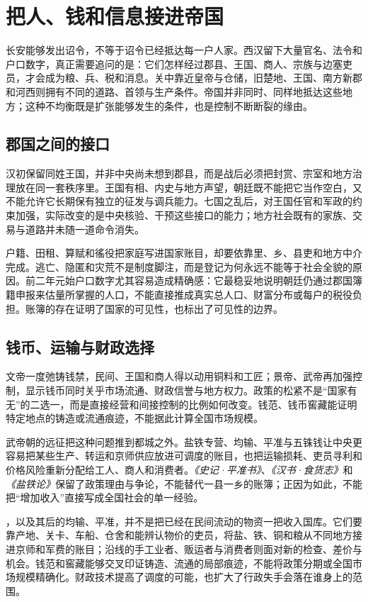 \section{把人、钱和信息接进帝国}
\label{sec:han-imperial-capacity}

长安能够发出诏令，不等于诏令已经抵达每一户人家。西汉留下大量官名、法令和户口数字，真正需要追问的是：它们怎样经过郡县、王国、商人、宗族与边塞吏员，才会成为粮、兵、税和消息。关中靠近皇帝与仓储，旧楚地、王国、南方新郡和河西则拥有不同的道路、首领与生产条件。帝国并非同时、同样地抵达这些地方；这种不均衡既是扩张能够发生的条件，也是控制不断断裂的缘由。

\subsection{郡国之间的接口}

汉初保留同姓王国，并非中央尚未想到郡县，而是战后必须把封赏、宗室和地方治理放在同一套秩序里。王国有相、内史与地方声望，朝廷既不能把它当作空白，又不能允许它长期保有独立的征发与调兵能力。七国之乱后，对王国任官和军政的约束加强，实际改变的是中央核验、干预这些接口的能力；地方社会既有的家族、交易与道路并未随一道命令消失。

户籍、田租、算赋和徭役把家庭写进国家账目，却要依靠里、乡、县吏和地方中介完成。逃亡、隐匿和灾荒不是制度脚注，而是登记为何永远不能等于社会全貌的原因。前二年元始户口数字尤其容易造成精确感：它最稳妥地说明朝廷仍通过郡国簿籍申报来估量所掌握的人口，不能直接推成真实总人口、财富分布或每户的税役负担。账簿的存在证明了国家的可见性，也标出了可见性的边界。

\subsection{钱币、运输与财政选择}

文帝一度弛铸钱禁，民间、王国和商人得以动用铜料和工匠；景帝、武帝再加强控制，显示钱币同时关乎市场流通、财政信誉与地方权力。政策的松紧不是“国家有无”的二选一，而是直接经营和间接控制的比例如何改变。钱范、钱币窖藏能证明特定地点的铸造或流通痕迹，不能据此计算全国市场规模。

武帝朝的远征把这种问题推到都城之外。盐铁专营、均输、平准与五铢钱让中央更容易把某些生产、转运和京师供应放进可调度的账目，也把运输损耗、吏员寻利和价格风险重新分配给工人、商人和消费者。\textit{《史记·平准书》}、\textit{《汉书·食货志》}和\textit{《盐铁论》}保留了政策理由与争论，不能替代一县一乡的账簿；正因为如此，不能把“增加收入”直接写成全国社会的单一经验。

，以及其后的均输、平准，并不是把已经在民间流动的物资一把收入国库。它们要靠产地、关卡、车船、仓舍和能辨认物价的吏员，将盐、铁、铜和粮从不同地方接进京师和军费的账目；沿线的手工业者、贩运者与消费者则面对新的检查、差价与机会。钱范和窖藏能够交叉印证铸造、流通的局部痕迹，不能将政策分期或全国市场规模精确化。财政技术提高了调度的可能，也扩大了行政失手会落在谁身上的范围。


